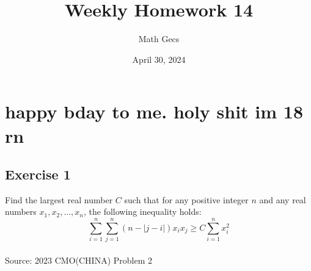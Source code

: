 \documentclass[12pt]{article}
\title{Weekly Homework 14}
\author{Math Gecs}
\date{April 30, 2024}
\begin{document}
\maketitle

\section*{happy bday to me. holy shit im 18 rn}

\subsection*{Exercise 1}
Find the largest real number $C$ such that for any positive integer $n$ and any real numbers $x_1, x_2, \ldots, x_n$, the following inequality holds:
$$
\sum_{i=1}^n \sum_{j=1}^n(n-|j-i|) x_i x_j \geq C \sum_{i=1}^n x_i^2
$$
\\

Source: 2023 CMO(CHINA) Problem 2\\
\end{document}
